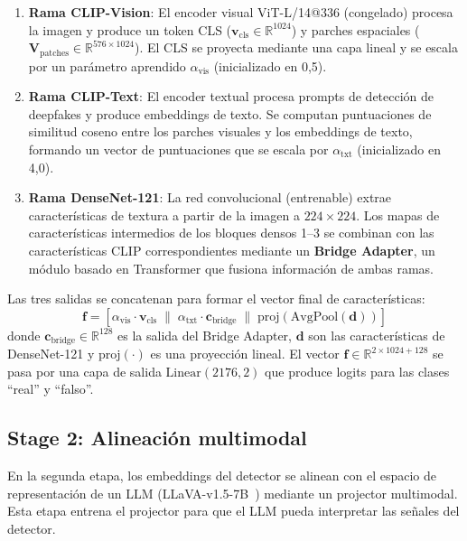 \documentclass[pdflatex,sn-mathphys-num]{sn-jnl}
\begin{document}
\begin{enumerate}
    \item \textbf{Rama CLIP-Vision}: El encoder visual ViT-L/14@336 (congelado) procesa la imagen y produce un token CLS ($\mathbf{v}_{\text{cls}} \in \mathbb{R}^{1024}$) y parches espaciales ($\mathbf{V}_{\text{patches}} \in \mathbb{R}^{576 \times 1024}$). El CLS se proyecta mediante una capa lineal y se escala por un parámetro aprendido $\alpha_{\text{vis}}$ (inicializado en 0,5).

    \item \textbf{Rama CLIP-Text}: El encoder textual procesa prompts de detección de deepfakes y produce embeddings de texto. Se computan puntuaciones de similitud coseno entre los parches visuales y los embeddings de texto, formando un vector de puntuaciones que se escala por $\alpha_{\text{txt}}$ (inicializado en 4,0).

    \item \textbf{Rama DenseNet-121}: La red convolucional (entrenable) extrae características de textura a partir de la imagen a $224\times224$. Los mapas de características intermedios de los bloques densos 1--3 se combinan con las características CLIP correspondientes mediante un \textbf{Bridge Adapter}, un módulo basado en Transformer que fusiona información de ambas ramas.
\end{enumerate}

Las tres salidas se concatenan para formar el vector final de características:
\begin{equation}
    \mathbf{f} = [\alpha_{\text{vis}} \cdot \mathbf{v}_{\text{cls}} \;\|\; \alpha_{\text{txt}} \cdot \mathbf{c}_{\text{bridge}} \;\|\; \text{proj}(\text{AvgPool}(\mathbf{d}))]
    \label{eq:feature_concat}
\end{equation}
donde $\mathbf{c}_{\text{bridge}} \in \mathbb{R}^{128}$ es la salida del Bridge Adapter, $\mathbf{d}$ son las características de DenseNet-121 y $\text{proj}(\cdot)$ es una proyección lineal. El vector $\mathbf{f} \in \mathbb{R}^{2 \times 1024 + 128}$ se pasa por una capa de salida $\text{Linear}(2176, 2)$ que produce logits para las clases ``real'' y ``falso''.

\subsection{Stage 2: Alineación multimodal}

En la segunda etapa, los embeddings del detector se alinean con el espacio de representación de un LLM (LLaVA-v1.5-7B~\cite{liu2023llava}) mediante un projector multimodal. Esta etapa entrena el projector para que el LLM pueda interpretar las señales del detector.
\end{document}
